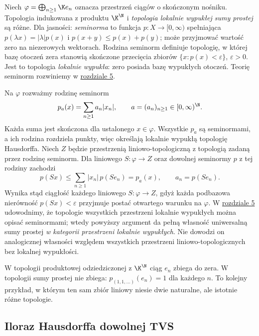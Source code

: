 \begin{przyklad}\label{ex:direct-sum}
Niech $\varphi=\bigoplus_{n\geq1}\K e_n$ oznacza
przestrzeń ciągów o skończonym nośniku. Topologia
indukowana z produktu $\K^{\N}$ i \emph{topologia
lokalnie wypukłej sumy prostej} są różne.
Dla jasności: \emph{seminorma} to funkcja $p:X\to[0,\infty)$
spełniająca $p(\lambda x)=|\lambda|p(x)$ i
$p(x+y)\leq p(x)+p(y)$; może przyjmować wartość zero
na niezerowych wektorach. Rodzina seminorm definiuje topologię,
w której bazę otoczeń zera stanowią skończone przecięcia
zbiorów $\{x:p(x)<\varepsilon\}$, $\varepsilon>0$.
Jest to topologia \emph{lokalnie wypukła}: zero posiada bazę
wypukłych otoczeń. Teorię seminorm rozwiniemy w \hyperref[sec:lokalnie-wypukle]{rozdziale 5}.

Na $\varphi$ rozważmy rodzinę seminorm
\[
 p_a(x)=\sum_{n\geq1}a_n|x_n|,
 \qquad a=(a_n)_{n\geq1}\in[0,\infty)^{\N}.
\]
Każda suma jest skończona dla ustalonego $x\in\varphi$.
Wszystkie $p_a$ są seminormami, a ich rodzina
rozdziela punkty, więc określają lokalnie wypukłą
topologię Hausdorffa. Niech $Z$ będzie przestrzenią
liniowo-topologiczną z topologią zadaną przez rodzinę
seminorm. Dla liniowego $S:\varphi\to Z$ oraz
dowolnej seminormy $p$ z tej rodziny zachodzi
\[
 p(Sx)\leq\sum_{n\geq1}|x_n|\,p(S e_n)
         =p_a(x),\qquad a_n=p(S e_n).
\]
Wynika stąd ciągłość każdego liniowego $S:\varphi\to Z$,
gdyż każda podbazowa nierówność $p(Sx)<\varepsilon$
przyjmuje postać otwartego warunku na $\varphi$.
W \hyperref[sec:lokalnie-wypukle]{rozdziale 5} udowodnimy, że topologie wszystkich
przestrzeni lokalnie wypukłych można opisać seminormami;
wtedy powyższy argument da pełną własność uniwersalną
sumy prostej \emph{w kategorii przestrzeni lokalnie wypukłych}.
Nie dowodzi on analogicznej własności względem wszystkich
przestrzeni liniowo-topologicznych bez lokalnej wypukłości.

W topologii produktowej odziedziczonej z $\K^{\N}$
ciąg $e_n$ zbiega do zera. W topologii sumy prostej
nie zbiega: $p_{(1,1,\dots)}(e_n)=1$ dla każdego $n$.
To kolejny przykład, w którym ten sam zbiór liniowy
niesie dwie naturalne, ale istotnie różne topologie.
\end{przyklad}

\subsection{Iloraz Hausdorffa dowolnej TVS}


